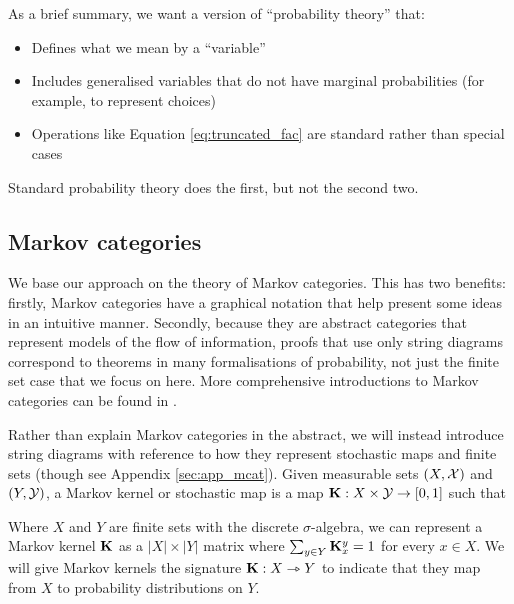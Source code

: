As a brief summary, we want a version of ``probability theory'' that:
\begin{itemize}
	\item Defines what we mean by a ``variable''
	\item Includes generalised variables that do not have marginal probabilities (for example, to represent choices)
	\item Operations like Equation \ref{eq:truncated_fac} are standard rather than special cases
\end{itemize}

Standard probability theory does the first, but not the second two.

\subsection{Markov categories}
We base our approach on the theory of Markov categories. This has two benefits: firstly, Markov categories have a graphical notation that help present some ideas in an intuitive manner. Secondly, because they are abstract categories that represent models of the flow of information, proofs that use only string diagrams correspond to theorems in many formalisations of probability, not just the finite set case that we focus on here. More comprehensive introductions to Markov categories can be found in \citet{fritz_synthetic_2020,cho_disintegration_2019}.

Rather than explain Markov categories in the abstract, we will instead introduce string diagrams with reference to how they represent stochastic maps and finite sets (though see Appendix \ref{sec:app_mcat}). Given measurable sets $(X,\mathcal{X})$ and $(Y,\mathcal{Y})$, a Markov kernel or stochastic map is a map $\mathbf{K}:X\times \mathcal{Y}\to [0,1]$ such that

\begin{itemize}
	\item The map $x\mapsto \kernel{K}(x,A)$ is $\sigalg{X}$-measurable for every $A\in \sigalg{Y}$
	\item The map $A\mapsto \kernel{K}(x,A)$} is a probability measure for every $x\in X$
\end{itemize}

Where $X$ and $Y$ are finite sets with the discrete $\sigma$-algebra, we can represent a Markov kernel $\mathbf{K}$ as a $|X|\times |Y|$ matrix where $\sum_{y\in Y} \mathbf{K}_x^y = 1$ for every $x\in X$. We will give Markov kernels the signature $\mathbf{K}:X\rightarrowtriangle Y$ to indicate that they map from $X$ to probability distributions on $Y$.

